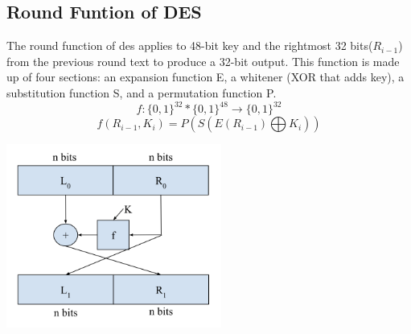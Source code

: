 \documentclass[11pt]{article}
\begin{document}
\subsection*{Round Funtion of DES}
The round function of des applies to 48-bit key and the rightmost 32 bits($R_{i-1}$) from the previous round text to produce a 32-bit output. This function is made up of four sections: an expansion function E, a whitener (XOR that adds key), a substitution function S, and a permutation function P.\\
\[ f : \{0, 1\}^{32} \ast \{0, 1\}^{48} \to \{0, 1\}^{32} \]
\[ f(R_{i-1}, K_i) = P(S(E(R_{i-1}) \bigoplus K_i)) \]
\begin{center}
\includegraphics[width=200pt]{p1.png}
\end{center}
\end{document}

